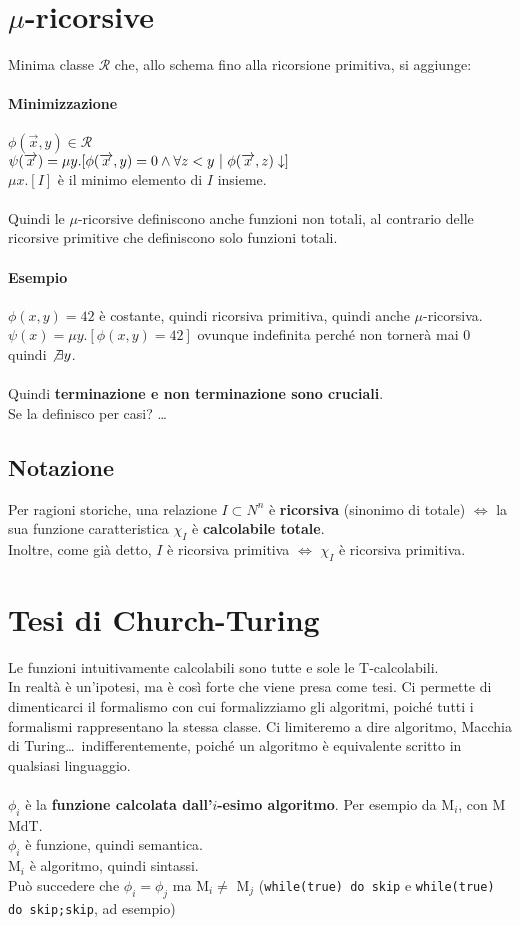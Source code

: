 \documentclass[10pt]{book}
\begin{document}
\section{$\mu$-ricorsive}
Minima classe $\mathscr{R}$ che, allo schema fino alla ricorsione primitiva, si aggiunge:
\paragraph{Minimizzazione} $\phi(\overrightarrow{x}, y) \in \mathscr{R}$\\
$\psi(\overrightarrow{x}) = \mu y.[\phi(\overrightarrow{x}, y) = 0 \wedge \forall z < y\:\:\vline\:\: \phi(\overrightarrow{x}, z)\downarrow] $\\
$\mu x.[I]$ è il minimo elemento di $I$ insieme.\\\\
Quindi le $\mu$-ricorsive definiscono anche funzioni non totali, al contrario delle ricorsive primitive che definiscono solo funzioni totali.
\paragraph{Esempio} $\phi(x, y) = 42$ è costante, quindi ricorsiva primitiva, quindi anche $\mu$-ricorsiva.\\
$\psi(x) = \mu y.[\phi(x, y) = 42]$ ovunque indefinita perché non tornerà mai 0 quindi $\not\exists y$.\\\\
Quindi \textbf{terminazione e non terminazione sono cruciali}.\\
Se la definisco per casi? \ldots
\subsection{Notazione}
Per ragioni storiche, una relazione $I \subset N^n$ è \textbf{ricorsiva} (sinonimo di totale) $\Leftrightarrow$ la sua funzione caratteristica $\chi_I$ è \textbf{calcolabile totale}.\\
Inoltre, come già detto, $I$ è ricorsiva primitiva $\Leftrightarrow$ $\chi_I$ è ricorsiva primitiva.
\section{Tesi di Church-Turing}
Le funzioni intuitivamente calcolabili sono tutte e sole le T-calcolabili.\\
In realtà è un'ipotesi, ma è così forte che viene presa come tesi. Ci permette di dimenticarci il formalismo con cui formalizziamo gli algoritmi, poiché tutti i formalismi rappresentano la stessa classe. Ci limiteremo a dire algoritmo, Macchia di Turing\ldots$\,$ indifferentemente, poiché un algoritmo è equivalente scritto in qualsiasi linguaggio.\\\\
$\phi_i$ è la \textbf{funzione calcolata dall'$i$-esimo algoritmo}. Per esempio da M$_i$, con M MdT.\\
$\phi_i$ è funzione, quindi semantica.\\
M$_i$ è algoritmo, quindi sintassi.\\
Può succedere che $\phi_i = \phi_j$ ma M$_i \neq$ M$_j$ (\texttt{while(true) do skip} e \texttt{while(true) do skip;skip}, ad esempio)\\
\end{document}
